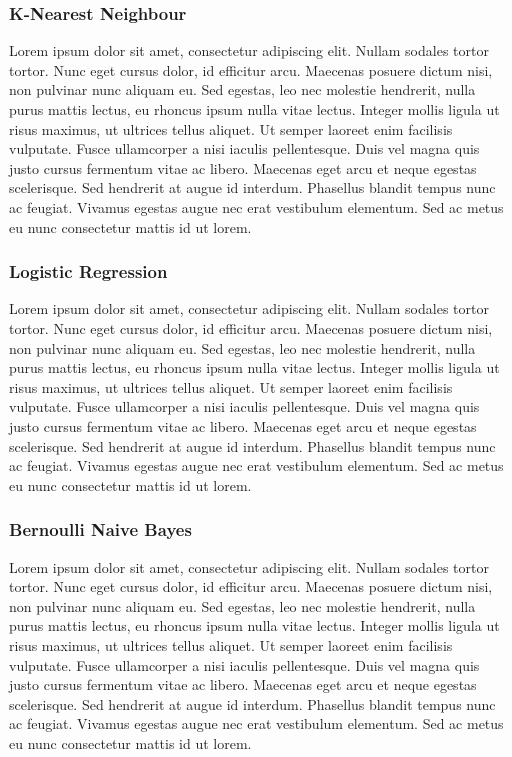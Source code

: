 \subsubsection{K-Nearest Neighbour}
Lorem ipsum dolor sit amet, consectetur adipiscing elit. Nullam sodales tortor tortor. Nunc eget cursus dolor, id efficitur arcu. Maecenas posuere dictum nisi, non pulvinar nunc aliquam eu. Sed egestas, leo nec molestie hendrerit, nulla purus mattis lectus, eu rhoncus ipsum nulla vitae lectus. Integer mollis ligula ut risus maximus, ut ultrices tellus aliquet. Ut semper laoreet enim facilisis vulputate. Fusce ullamcorper a nisi iaculis pellentesque. Duis vel magna quis justo cursus fermentum vitae ac libero. Maecenas eget arcu et neque egestas scelerisque. Sed hendrerit at augue id interdum. Phasellus blandit tempus nunc ac feugiat. Vivamus egestas augue nec erat vestibulum elementum. Sed ac metus eu nunc consectetur mattis id ut lorem.

\subsubsection{Logistic Regression}
Lorem ipsum dolor sit amet, consectetur adipiscing elit. Nullam sodales tortor tortor. Nunc eget cursus dolor, id efficitur arcu. Maecenas posuere dictum nisi, non pulvinar nunc aliquam eu. Sed egestas, leo nec molestie hendrerit, nulla purus mattis lectus, eu rhoncus ipsum nulla vitae lectus. Integer mollis ligula ut risus maximus, ut ultrices tellus aliquet. Ut semper laoreet enim facilisis vulputate. Fusce ullamcorper a nisi iaculis pellentesque. Duis vel magna quis justo cursus fermentum vitae ac libero. Maecenas eget arcu et neque egestas scelerisque. Sed hendrerit at augue id interdum. Phasellus blandit tempus nunc ac feugiat. Vivamus egestas augue nec erat vestibulum elementum. Sed ac metus eu nunc consectetur mattis id ut lorem.

\subsubsection{Bernoulli Naive Bayes}
Lorem ipsum dolor sit amet, consectetur adipiscing elit. Nullam sodales tortor tortor. Nunc eget cursus dolor, id efficitur arcu. Maecenas posuere dictum nisi, non pulvinar nunc aliquam eu. Sed egestas, leo nec molestie hendrerit, nulla purus mattis lectus, eu rhoncus ipsum nulla vitae lectus. Integer mollis ligula ut risus maximus, ut ultrices tellus aliquet. Ut semper laoreet enim facilisis vulputate. Fusce ullamcorper a nisi iaculis pellentesque. Duis vel magna quis justo cursus fermentum vitae ac libero. Maecenas eget arcu et neque egestas scelerisque. Sed hendrerit at augue id interdum. Phasellus blandit tempus nunc ac feugiat. Vivamus egestas augue nec erat vestibulum elementum. Sed ac metus eu nunc consectetur mattis id ut lorem.


